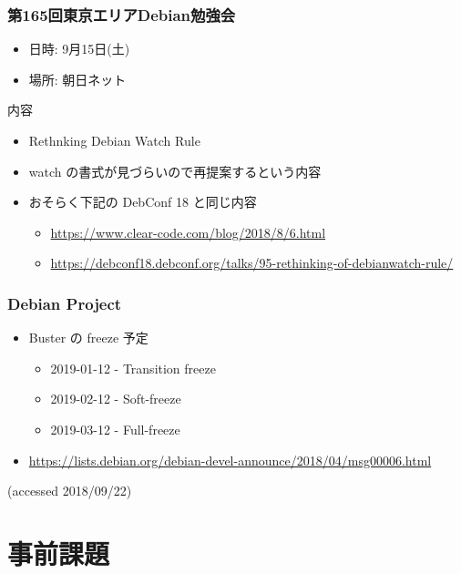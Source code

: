 \documentclass[cjk,dvipdfmx,10pt,compress,%
hyperref={bookmarks=true,bookmarksnumbered=true,bookmarksopen=false,%
colorlinks=false,%
pdftitle={第 132 回 関西 Debian 勉強会},%
pdfauthor={かわだ},%
pdfsubject={資料},%
}]{beamer}
\begin{document}
\begin{frame}[fragile]
  \frametitle{第165回東京エリアDebian勉強会}
  \begin{itemize}
  \item 日時: 9月15日(土)
  \item 場所: 朝日ネット
  \end{itemize}
  \begin{block}{内容}
    \begin{itemize}
    \item Rethnking Debian Watch Rule
	\item watch の書式が見づらいので再提案するという内容
	\item おそらく下記の DebConf 18 と同じ内容
    	\begin{itemize}
		\item \url{https://www.clear-code.com/blog/2018/8/6.html}
		\item \url{https://debconf18.debconf.org/talks/95-rethinking-of-debianwatch-rule/}
    	\end{itemize}
    \end{itemize}
  \end{block}
\end{frame}

\begin{frame}[fragile]
  \frametitle{Debian Project}
  \begin{itemize}
  \item Buster の freeze 予定
  	\begin{itemize}
   	\item 2019-01-12 - Transition freeze
   	\item 2019-02-12 - Soft-freeze
   	\item 2019-03-12 - Full-freeze 
  	\end{itemize}
  \item \url{https://lists.debian.org/debian-devel-announce/2018/04/msg00006.html}
  \end{itemize} (accessed 2018/09/22)
\end{frame}

\section{事前課題}

\end{document}
